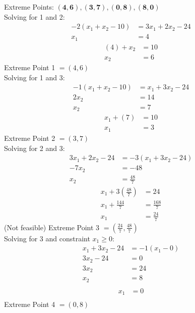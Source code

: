 \documentclass{article}
\begin{document}
\begin{enumerate}
\begin{enumerate}
    Extreme Points: $\mathbf{(4, 6), (3, 7), (0, 8), (8, 0)}$ \\

    Solving for 1 and 2:
    \begin{align*}
    -2(x_{1} + x_{2} - 10)  &=  3x_{1} + 2x_{2} - 24 \\
                      x_{1} &= 4
    \end{align*}
    \begin{align*}
    (4) + x_{2} &= 10 \\
          x_{2} &= 6
    \end{align*}
    Extreme Point 1 $= (4, 6)$ \\

    Solving for 1 and 3:\\
    \begin{align*}
    -1( x_{1} + x_{2} - 10)  &=  x_{1} + 3x_{2} - 24  \\
                     2x_{2}  &=  14  \\
                      x_{2}  &=  7
    \end{align*}
    \begin{align*}
    x_{1} + (7) &= 10 \\
    x_{1}       &= 3
    \end{align*}
    Extreme Point 2 $= (3, 7)$ \\

    Solving for 2 and 3:\\
    \begin{align*}
    3x_{1} + 2x_{2} - 24  &=  -3( x_{1} + 3x_{2} - 24) \\
                 -7x_{2}  &=  -48  \\
                   x_{2}  &=  \frac{48}{7}
    \end{align*}
    \begin{align*}
    x_{1} + 3(\frac{48}{7})  &=  24 \\
    x_{1} + \frac{144}{7}    &=  \frac{168}{7} \\
    x_{1}                    &=  \frac{24}{7}
    \end{align*}
    (Not feasible) Extreme Point 3 $= (\frac{24}{7}, \frac{48}{7})$ \\

    Solving for 3 and constraint $x_1 \ge 0$:\\
    \begin{align*}
    x_{1} + 3x_{2} - 24  &=  -1(x_{1} - 0) \\
            3x_{2} - 24  &=  0 \\
                 3x_{2}  &=  24 \\
                  x_{2}  &=  8 \\
    \end{align*}
    \begin{align*}
    x_{1}  &=  0 \\
    \end{align*}
    Extreme Point 4 $= (0, 8)$ \\


\end{enumerate}
\end{enumerate}
\end{document}
